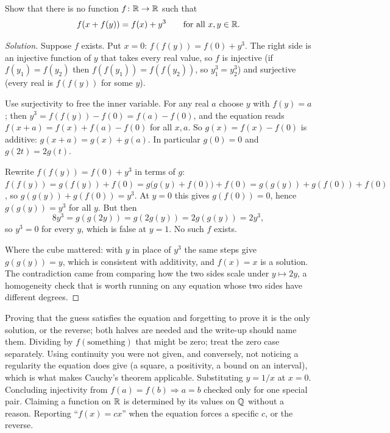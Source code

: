 \begin{example}
Show that there is no function $f\colon\mathbb{R}\to\mathbb{R}$ such that
\[
f(x+f(y))=f(x)+y^3\qquad\text{for all }x,y\in\mathbb{R}.
\]
\end{example}

\begin{proof}[Solution]
Suppose $f$ exists. Put $x=0$: $f(f(y))=f(0)+y^3$. The right side is an injective function of $y$ that takes every real value, so $f$ is injective (if $f(y_1)=f(y_2)$ then $f(f(y_1))=f(f(y_2))$, so $y_1^3=y_2^3$) and surjective (every real is $f(f(y))$ for some $y$).

Use surjectivity to free the inner variable. For any real $a$ choose $y$ with $f(y)=a$; then $y^3=f(f(y))-f(0)=f(a)-f(0)$, and the equation reads $f(x+a)=f(x)+f(a)-f(0)$ for all $x,a$. So $g(x)=f(x)-f(0)$ is additive: $g(x+a)=g(x)+g(a)$. In particular $g(0)=0$ and $g(2t)=2g(t)$.

Rewrite $f(f(y))=f(0)+y^3$ in terms of $g$: $f(f(y))=g(f(y))+f(0)=g\bigl(g(y)+f(0)\bigr)+f(0)=g(g(y))+g(f(0))+f(0)$, so $g(g(y))+g(f(0))=y^3$. At $y=0$ this gives $g(f(0))=0$, hence $g(g(y))=y^3$ for all $y$. But then
\[
8y^3=g(g(2y))=g(2g(y))=2g(g(y))=2y^3,
\]
so $y^3=0$ for every $y$, which is false at $y=1$. No such $f$ exists.

Where the cube mattered: with $y$ in place of $y^3$ the same steps give $g(g(y))=y$, which is consistent with additivity, and $f(x)=x$ is a solution. The contradiction came from comparing how the two sides scale under $y\mapsto2y$, a homogeneity check that is worth running on any equation whose two sides have different degrees.
\end{proof}

\begin{trap}
Proving that the guess satisfies the equation and forgetting to prove it is the only solution, or the reverse; both halves are needed and the write-up should name them. Dividing by $f(\text{something})$ that might be zero; treat the zero case separately. Using continuity you were not given, and conversely, not noticing a regularity the equation does give (a square, a positivity, a bound on an interval), which is what makes Cauchy's theorem applicable. Substituting $y=1/x$ at $x=0$. Concluding injectivity from $f(a)=f(b)\Rightarrow a=b$ checked only for one special pair. Claiming a function on $\mathbb{R}$ is determined by its values on $\mathbb{Q}$ without a reason. Reporting ``$f(x)=cx$'' when the equation forces a specific $c$, or the reverse.
\end{trap}

